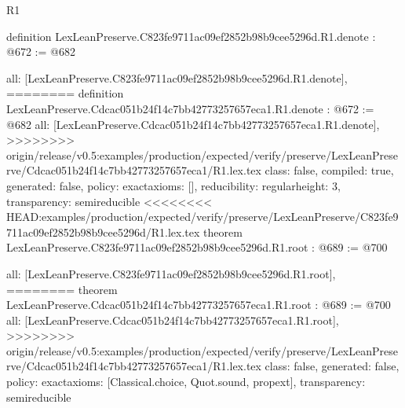 \begin{lexlean}{R1}
\begin{coremodule}
{{{{{{definition LexLeanPreserve.C823fe9711ac09ef2852b98b9cee5296d.R1.denote : @672 := @682 {
  all: [LexLeanPreserve.C823fe9711ac09ef2852b98b9cee5296d.R1.denote],
========
definition LexLeanPreserve.Cdcac051b24f14c7bb42773257657eca1.R1.denote : @672 := @682 {
  all: [LexLeanPreserve.Cdcac051b24f14c7bb42773257657eca1.R1.denote],
>>>>>>>> origin/release/v0.5:examples/production/expected/verify/preserve/LexLeanPreserve/Cdcac051b24f14c7bb42773257657eca1/R1.lex.tex
  class: false,
  compiled: true,
  generated: false,
  policy: exact{axioms: []},
  reducibility: regular{height: 3},
  transparency: semireducible
}
<<<<<<<< HEAD:examples/production/expected/verify/preserve/LexLeanPreserve/C823fe9711ac09ef2852b98b9cee5296d/R1.lex.tex
theorem LexLeanPreserve.C823fe9711ac09ef2852b98b9cee5296d.R1.root : @689 := @700 {
  all: [LexLeanPreserve.C823fe9711ac09ef2852b98b9cee5296d.R1.root],
========
theorem LexLeanPreserve.Cdcac051b24f14c7bb42773257657eca1.R1.root : @689 := @700 {
  all: [LexLeanPreserve.Cdcac051b24f14c7bb42773257657eca1.R1.root],
>>>>>>>> origin/release/v0.5:examples/production/expected/verify/preserve/LexLeanPreserve/Cdcac051b24f14c7bb42773257657eca1/R1.lex.tex
  class: false,
  generated: false,
  policy: exact{axioms: [Classical.choice, Quot.sound, propext]},
  transparency: semireducible
}

}}}}}}}}
\end{coremodule}
\end{lexlean}
